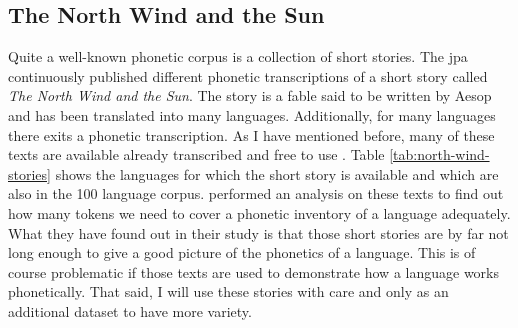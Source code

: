 \subsection{The North Wind and the Sun}
\label{nws}
Quite a well-known phonetic corpus is a collection of short stories. The \ac{jpa} continuously published different phonetic transcriptions of a short story called \textit{The North Wind and the Sun}. The story is a fable said to be written by Aesop and has been translated into many languages. Additionally, for many languages there exits a phonetic transcription. As I have mentioned before, many of these texts are available already transcribed and free to use \citep{GitHub.04.02.2022}. Table \ref{tab:north-wind-stories} shows the languages for which the short story is available and which are also in the 100 language corpus. \citet{baird_evans_greenhill_2021} performed an analysis on these texts to find out how many tokens we need to cover a phonetic inventory of a language adequately. What they have found out in their study is that those short stories are by far not long enough to give a good picture of the phonetics of a language. This is of course problematic if those texts are used to demonstrate how a language works phonetically. That said, I will use these stories with care and only as an additional dataset to have more variety.

